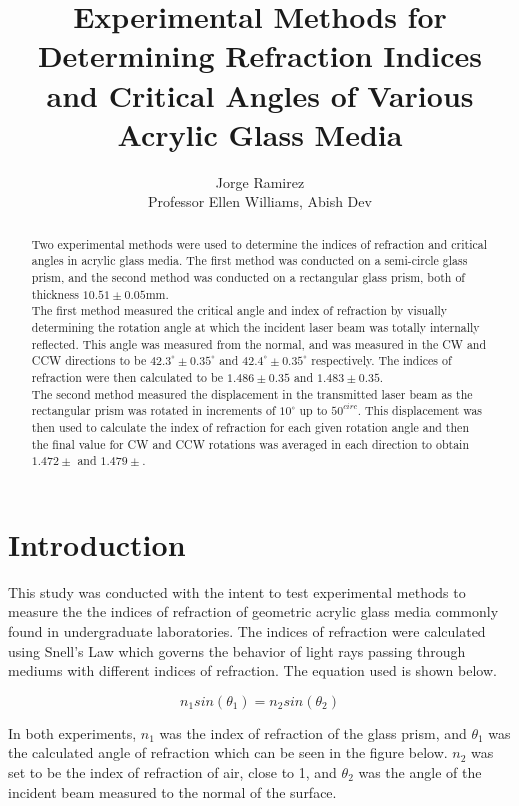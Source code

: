 \documentclass[colorlinks=true,pdfstartview=FitV,linkcolor=blue,
            citecolor=red,urlcolor=magenta]{basedoc}
\title{Experimental Methods for Determining Refraction Indices and Critical Angles of Various Acrylic Glass Media}
\author{Jorge Ramirez \\
Professor Ellen Williams, Abish Dev}
\begin{document}
  \begin{abstract}
    Two experimental methods were used to determine the indices of refraction and critical angles in acrylic glass media. The first method was conducted on a semi-circle glass prism, and the second method was conducted on a rectangular glass prism, both of thickness $10.51 \pm 0.05$mm.
    \\
    \indent The first method measured the critical angle and index of refraction by visually determining the rotation angle at which the incident laser beam was totally internally reflected. This angle was measured from the normal, and was measured in the CW and CCW directions to be $42.3^{\circ} \pm 0.35^{\circ}$ and $42.4^{\circ} \pm 0.35^{\circ}$ respectively. The indices of refraction were then calculated to be $1.486 \pm 0.35$ and $1.483 \pm 0.35$.
    \\
    \indent The second method measured the displacement in the transmitted laser beam as the rectangular prism was rotated in increments of $10^{\circ}$ up to $50^{circ}$. This displacement was then used to calculate the index of refraction for each given rotation angle and then the final value for CW and CCW rotations was averaged in each direction to obtain $1.472 \pm $ and  $1.479 \pm $.

  \end{abstract}

\section{Introduction}
  This study was conducted with the intent to test experimental methods to measure the the indices of refraction of geometric acrylic glass media commonly found in undergraduate laboratories. The indices of refraction were calculated using Snell's Law which governs the behavior of light rays passing through mediums with different indices of refraction. The equation used is shown below.

    \begin{equation} \label{eq:snell}
      n_1 sin(\theta_1) = n_2 sin(\theta_2)
    \end{equation}

  In both experiments, $n_1$ was the index of refraction of the glass prism, and $\theta_1$ was the calculated angle of refraction which can be seen in the figure below. $n_2$ was set to be the index of refraction of air, close to 1, and $\theta_2$ was the angle of the incident beam measured to the normal of the surface.
\end{document}
